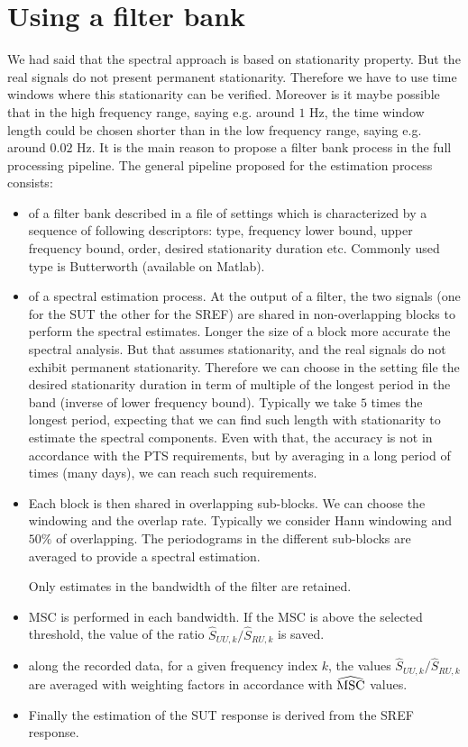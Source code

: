 \section{Using a filter bank}
We had said that the spectral approach is based on stationarity property. But the real signals do not present permanent stationarity. Therefore we have to use time windows where this stationarity can be verified. Moreover is it maybe possible that in the high frequency range, saying e.g. around $1$ Hz, the time window length could be chosen shorter than in the low frequency range, saying e.g. around $0.02$ Hz. It is the main reason to propose a filter bank process in the full processing pipeline. The general pipeline proposed for the estimation process consists:
\begin{itemize}
\item
of a filter bank described in a file of settings which is characterized by a sequence of following descriptors: type, frequency lower bound, upper frequency bound, order, desired stationarity duration etc. Commonly used type is Butterworth (available on Matlab).
\item
of a spectral estimation process. At the output of a filter, the two signals (one for the SUT the other for the SREF) are shared in non-overlapping blocks to perform the spectral estimates. Longer the size of a block more accurate the spectral analysis. But that assumes stationarity, and the real signals do not exhibit permanent stationarity. Therefore we can choose in the setting file the desired stationarity duration in term of multiple of the longest period in the band (inverse of lower frequency bound). Typically we take  $5$ times the longest period, expecting that we can find such length with stationarity to estimate the spectral components. Even with that, the accuracy is not in accordance with the PTS requirements, but by averaging in a long period of times (many days), we can reach such requirements.
\item
Each block is then shared in overlapping sub-blocks. We can choose the windowing and the overlap rate. Typically we consider Hann windowing and $50\%$ of overlapping. The periodograms in the different sub-blocks are averaged to provide a spectral estimation. 

Only estimates in the bandwidth of the filter are retained.
\item
MSC is performed in each bandwidth. If the MSC is above the selected threshold, the value of the ratio $\hat S_{UU,k}/\hat S_{RU,k}$ is saved.
\item
along the recorded data, for a given frequency index $k$, the values  $\hat S_{UU,k}/\hat S_{RU,k}$ are averaged with weighting factors in accordance with $\widehat{\mathrm{MSC}}$ values.
\item
Finally the estimation of the SUT response is derived from the SREF response.
\end{itemize}

